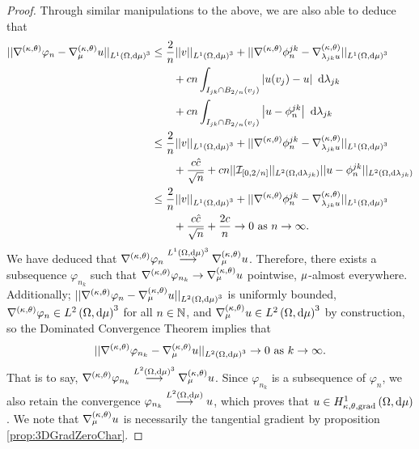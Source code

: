 \begin{proof}
	Through similar manipulations to the above, we are also able to deduce that
	\begin{align*}
		\norm{\ktgrad\varphi_n-\ktgrad_{\ddmes}u}_{L^1\bracs{\ddom,\md\ddmes}^3}
		&\leq \frac{2}{n}\norm{v}_{L^1\bracs{\ddom,\md\ddmes}^3}
		+ \norm{\ktgrad\phi_n^{jk} - \ktgrad_{\lambda_{jk}u}}_{L^1\bracs{\ddom,\md\ddmes}^3} \\
		&\qquad + cn\integral{I_{jk}\cap B_{2/n}(v_j)}{ \abs{u(v_j)-u} }{\lambda_{jk}} \\
		&\qquad + cn\integral{I_{jk}\cap B_{2/n}(v_j)}{ \abs{u-\phi_n^{jk}} }{\lambda_{jk}} \\
		&\leq \frac{2}{n}\norm{v}_{L^1\bracs{\ddom,\md\ddmes}^3}
		+ \norm{\ktgrad\phi_n^{jk} - \ktgrad_{\lambda_{jk}u}}_{L^1\bracs{\ddom,\md\ddmes}^3} \\
		&\qquad + \frac{c\hat{c}}{\sqrt{n}}
		+ cn\norm{\charFunc{\sqbracs{0,2/n}}}_{\ltwo{\ddom}{\lambda_{jk}}}\norm{u-\phi_n^{jk}}_{\ltwo{\ddom}{\lambda_{jk}}} \\
		&\leq \frac{2}{n}\norm{v}_{L^1\bracs{\ddom,\md\ddmes}^3}
		+ \norm{\ktgrad\phi_n^{jk} - \ktgrad_{\lambda_{jk}u}}_{L^1\bracs{\ddom,\md\ddmes}^3} \\
		&\qquad + \frac{c\hat{c}}{\sqrt{n}}
		+ \frac{2c}{n} \rightarrow0 \toInfty{n}.
	\end{align*}
	We have deduced that $\ktgrad\varphi_n\lconv{L^1\bracs{\ddom,\md\ddmes}^3}\ktgrad_{\ddmes}u$.
	Therefore, there exists a subsequence $\varphi_{n_k}$ such that $\ktgrad\varphi_{n_k}\rightarrow\ktgrad_{\ddmes}u$ pointwise, $\ddmes$-almost everywhere.
	Additionally; $\norm{\ktgrad\varphi_n-\ktgrad_{\ddmes}u}_{\ltwo{\ddom}{\ddmes}^3}$ is uniformly bounded, $\ktgrad\varphi_n\in\ltwo{\ddom}{\ddmes}^3$ for all $n\in\naturals$, and $\ktgrad_{\ddmes}u\in\ltwo{\ddom}{\ddmes}^3$ by construction, so the Dominated Convergence Theorem implies that
	\begin{align*}
		\norm{\ktgrad\varphi_{n_k}-\ktgrad_{\ddmes}u}_{\ltwo{\ddom}{\ddmes}^3} \rightarrow 0 \toInfty{k}.
	\end{align*}
	That is to say, $\ktgrad\varphi_{n_k}\lconv{\ltwo{\ddom}{\ddmes}^3}\ktgrad_{\ddmes}u$.
	Since $\varphi_{n_k}$ is a subsequence of $\varphi_n$, we also retain the convergence $\varphi_{n_k}\lconv{\ltwo{\ddom}{\ddmes}}u$, which proves that $u\in\ktgradSob{\ddom}{\ddmes}$.
	We note that $\ktgrad_{\ddmes}u$ is necessarily the tangential gradient by proposition \ref{prop:3DGradZeroChar}.
	

\end{proof}
